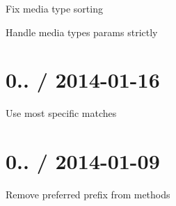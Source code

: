 \begin{DoxyItemize}
\item Fix media type sorting
\item Handle media types params strictly
\end{DoxyItemize}

\section*{0.. / 2014-\/01-\/16 }


\begin{DoxyItemize}
\item Use most specific matches
\end{DoxyItemize}

\section*{0.. / 2014-\/01-\/09 }


\begin{DoxyItemize}
\item Remove preferred prefix from methods 
\end{DoxyItemize}